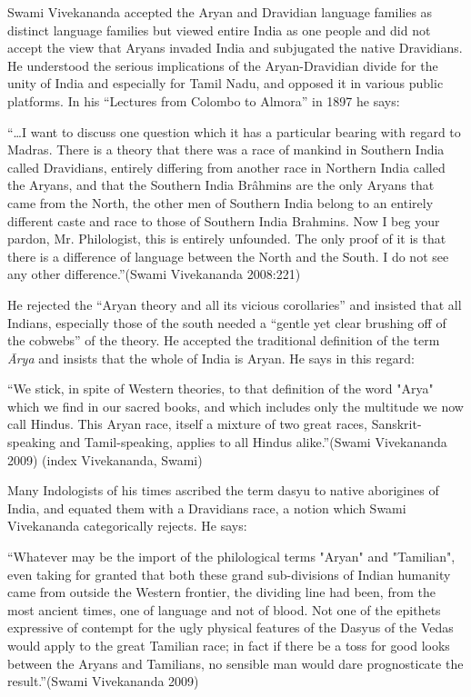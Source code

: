 Swami Vivekananda accepted the Aryan and Dravidian language families as distinct language families but viewed entire India as one people and did not accept the view that Aryans invaded India and subjugated the native Dravidians. He understood the serious implications of the Aryan-Dravidian divide for the unity of India and especially for Tamil Nadu, and opposed it in various public platforms. In his “Lectures from Colombo to Almora” in 1897 he says:

\begin{myquote}
“…I want to discuss one question which it has a particular bearing with regard to Madras. There is a theory that there was a race of mankind in Southern India called Dravidians, entirely differing from another race in Northern India called the Aryans, and that the Southern India Brâhmins are the only Aryans that came from the North, the other men of Southern India belong to an entirely different caste and race to those of Southern India Brahmins. Now I beg your pardon, Mr. Philologist, this is entirely unfounded. The only proof of it is that there is a difference of language between the North and the South. I do not see any other difference.”(Swami Vivekananda 2008:221)
\end{myquote}

He rejected the “Aryan theory and all its vicious corollaries” and insisted that all Indians, especially those of the south needed a “gentle yet clear brushing off of the cobwebs” of the theory. He accepted the traditional definition of the term \textit{Ārya} and insists that the whole of India is Aryan. He says in this regard:

\newpage

\begin{myquote}
“We stick, in spite of Western theories, to that definition of the word "Arya" which we find in our sacred books, and which includes only the multitude we now call Hindus. This Aryan race, itself a mixture of two great races, Sanskrit-speaking and Tamil-speaking, applies to all Hindus alike.”(Swami Vivekananda 2009) (index Vivekananda, Swami)
\end{myquote}

Many Indologists of his times ascribed the term dasyu to native aborigines of India, and equated them with a Dravidians race, a notion which Swami Vivekananda categorically rejects. He says:

\begin{myquote}
“Whatever may be the import of the philological terms "Aryan" and "Tamilian", even taking for granted that both these grand sub-divisions of Indian humanity came from outside the Western frontier, the dividing line had been, from the most ancient times, one of language and not of blood. Not one of the epithets expressive of contempt for the ugly physical features of the Dasyus of the Vedas would apply to the great Tamilian race; in fact if there be a toss for good looks between the Aryans and Tamilians, no sensible man would dare prognosticate the result.”(Swami Vivekananda 2009)
\end{myquote}

